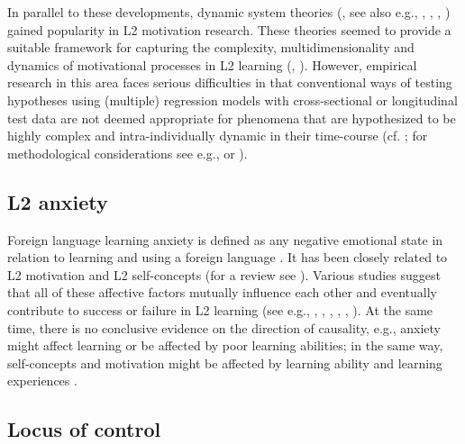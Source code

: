 \documentclass[output=paper]{langscibook}
\begin{document}
\begin{sloppypar}
In parallel to these developments, dynamic system theories (\citealt{LarsenFreeman1997}, see also e.g., \citealt{EllisLarsenFreeman2006}, \citealt{DeBotEtAl2007}, \citealt{LarsenFreemanCameron2008}, \citealt{LarsenFreeman2017}) gained popularity in L2 motivation research. These theories seemed to provide a suitable framework for capturing the complexity, multidimensionality and dynamics of motivational processes in L2 learning (\citealt{Doernyei2010}, \citealt{Waninge2015}). However, empirical research in this area faces serious difficulties in that conventional ways of testing hypotheses using (multiple) regression models with cross-sectional or longitudinal test data are not deemed appropriate for phenomena that are hypothesized to be highly complex and intra-individually dynamic in their time-course (cf. \citealt{Doernyei2014}; for methodological considerations see e.g., \citealt{VerspoorEtAl2011} or \citealt{DoernyeiEtAl2015}).
\end{sloppypar}

\subsection{L2 anxiety} %

Foreign language learning anxiety is defined as any negative emotional state in relation to learning and using a foreign language \citep{MacIntyre1999}. It has been closely related to L2 motivation and L2 self-concepts (for a review see \citealt{Horwitz2001}). Various studies suggest that all of these affective factors mutually influence each other and eventually contribute to success or failure in L2 learning (see e.g., \citealt{NoelsEtAl2000}, \citealt{PekrunEtAl2002}, \citealt{Stoeckli2004}, \citealt{KormosCsizer2008}, \citealt{LiuHuang2011}, \citealt{Heinzmann2013}). At the same time, there is no conclusive evidence on the direction of causality, e.g., anxiety might affect learning or be affected by poor learning abilities; in the same way, self-concepts and motivation might be affected by learning ability and learning experiences \citep{SparksEtAl2011}.

\subsection{Locus of control} %
\end{document}
